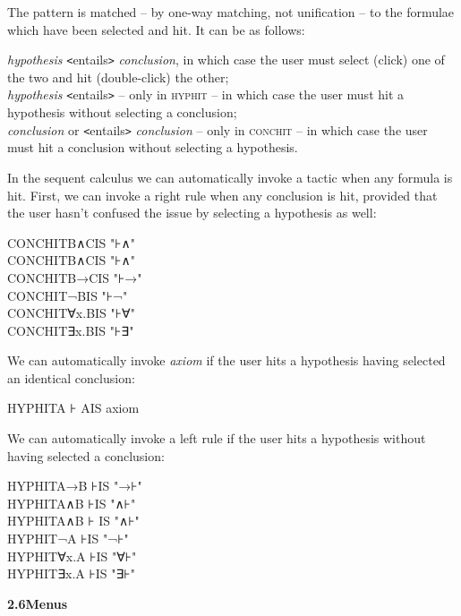 \documentclass[11pt]{book}
\newcommand{\tab}{\hspace{5mm}}
\begin{document}
The pattern is matched -- by one-way matching, not unification -- to the formulae which have been selected and hit. It can be as follows:


{\textbullet}\tab \textit{hypothesis} \texttt{<}entails\texttt{>} \textit{conclusion}, in which case the user must select (click) one of the two and hit (double-click) the other;\\
{\textbullet}\tab \textit{hypothesis} \texttt{<}entails\texttt{>} -- only in \textsc{hyphit} -- in which case the user must hit a hypothesis without selecting a conclusion;\\
{\textbullet}\tab \textit{conclusion} or \texttt{<}entails\texttt{>} \textit{conclusion} -- only in \textsc{conchit} -- in which case the user must hit a conclusion without selecting a hypothesis.


In the sequent calculus we can automatically invoke a tactic when any formula is hit. First, we can invoke a right rule when any conclusion is hit, provided that the user hasn't confused the issue by selecting a hypothesis as well:

CONCHIT\tab B∧C\tab IS "⊦∧"\\
CONCHIT\tab B∧C\tab IS "⊦∧"\\
CONCHIT\tab B→C\tab IS "⊦→"\\
CONCHIT\tab ¬B\tab IS "⊦¬"\\
CONCHIT\tab ∀x.B\tab IS "⊦∀"\\
CONCHIT\tab ∃x.B\tab IS "⊦∃"


We can automatically invoke \textit{axiom} if the user hits a hypothesis having selected an identical conclusion:

HYPHIT\tab A ⊦ A\tab IS axiom


We can automatically invoke a left rule if the user hits a hypothesis without having selected a conclusion:

HYPHIT\tab A→B ⊦\tab IS "→⊦"\\
HYPHIT\tab A∧B ⊦\tab IS "∧⊦"\\
HYPHIT\tab A∧B ⊦ \tab IS "∧⊦"\\
HYPHIT\tab ¬A ⊦\tab IS "¬⊦"\\
HYPHIT\tab ∀x.A ⊦\tab IS "∀⊦"\\
HYPHIT\tab ∃x.A ⊦\tab IS "∃⊦"


\textbf{{\large 2.6\tab Menus}}


Jape automatically provides some system menus, whose content varies between graphical interfaces and is therefore not described here. All other menus and panels are produced under the control of the encoder.
\end{document}
